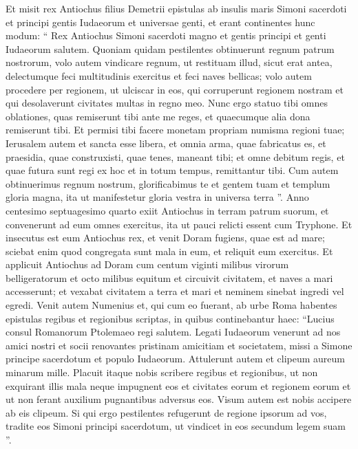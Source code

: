 \begin{biblechapter}
\begin{biblechapter}
\begin{biblechapter}
\begin{biblechapter}
\begin{biblechapter}
\begin{biblechapter}
\begin{biblechapter}
\begin{biblechapter}
\begin{biblechapter}
\begin{biblechapter}
\begin{biblechapter}
\begin{biblechapter}
\begin{biblechapter}
\begin{biblechapter}
\begin{biblechapter}
\verse Et misit rex Antiochus filius Demetrii epistulas ab insulis maris Simoni sacerdoti et principi gentis Iudaeorum et universae genti, 
\verse et erant continentes hunc modum: “ Rex Antiochus Simoni sacerdoti magno et gentis principi et genti Iudaeorum salutem. 
\verse Quoniam quidam pestilentes obtinuerunt regnum patrum nostrorum, volo autem vindicare regnum, ut restituam illud, sicut erat antea, delectumque feci multitudinis exercitus et feci naves bellicas; 
\verse volo autem procedere per regionem, ut ulciscar in eos, qui corruperunt regionem nostram et qui desolaverunt civitates multas in regno meo. 
 \verse Nunc ergo statuo tibi omnes oblationes, quas remiserunt tibi ante me reges, et quaecumque alia dona remiserunt tibi. 
\verse Et permisi tibi facere monetam propriam numisma regioni tuae; 
\verse Ierusalem autem et sancta esse libera, et omnia arma, quae fabricatus es, et praesidia, quae construxisti, quae tenes, maneant tibi; 
\verse et omne debitum regis, et quae futura sunt regi ex hoc et in totum tempus, remittantur tibi. 
\verse Cum autem obtinuerimus regnum nostrum, glorificabimus te et gentem tuam et templum gloria magna, ita ut manifestetur gloria vestra in universa terra ”.
 \verse Anno centesimo septuagesimo quarto exiit Antiochus in terram patrum suorum, et convenerunt ad eum omnes exercitus, ita ut pauci relicti essent cum Tryphone. 
\verse Et insecutus est eum Antiochus rex, et venit Doram fugiens, quae est ad mare; 
\verse sciebat enim quod congregata sunt mala in eum, et reliquit eum exercitus. 
 \verse Et applicuit Antiochus ad Doram cum centum viginti milibus virorum belligeratorum et octo milibus equitum 
\verse et circuivit civitatem, et naves a mari accesserunt; et vexabat civitatem a terra et mari et neminem sinebat ingredi vel egredi.
 \verse Venit autem Numenius et, qui cum eo fuerant, ab urbe Roma habentes epistulas regibus et regionibus scriptas, in quibus continebantur haec: 
\verse “Lucius consul Romanorum Ptolemaeo regi salutem. 
\verse Legati Iudaeorum venerunt ad nos amici nostri et socii renovantes pristinam amicitiam et societatem, missi a Simone principe sacerdotum et populo Iudaeorum. 
\verse Attulerunt autem et clipeum aureum minarum mille. 
\verse Placuit itaque nobis scribere regibus et regionibus, ut non exquirant illis mala neque impugnent eos et civitates eorum et regionem eorum et ut non ferant auxilium pugnantibus adversus eos. 
\verse Visum autem est nobis accipere ab eis clipeum. 
\verse Si qui ergo pestilentes refugerunt de regione ipsorum ad vos, tradite eos Simoni principi sacerdotum, ut vindicet in eos secundum legem suam ”. 

\end{biblechapter}
\end{biblechapter}
\end{biblechapter}
\end{biblechapter}
\end{biblechapter}
\end{biblechapter}
\end{biblechapter}
\end{biblechapter}
\end{biblechapter}
\end{biblechapter}
\end{biblechapter}
\end{biblechapter}
\end{biblechapter}
\end{biblechapter}
\end{biblechapter}
